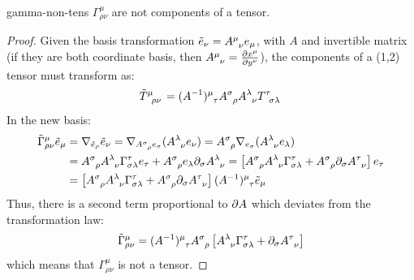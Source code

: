 \begin{proposition}{}{gamma-non-tens}
  $ \Gamma^\mu_{\rho \nu} $ are not components of a tensor.
\end{proposition}

\begin{proofbox}
  \begin{proof}
    Given the basis transformation $ \tilde{e}_\nu = \tensor{A}{^\mu _\nu} e_\mu $, with $ A $ and invertible matrix (if they are both coordinate basis, then $ \tensor{A}{^\mu _\nu} = \frac{\pa x^\mu}{\pa y^\nu} $), the components of a (1,2) tensor must transform as:
    \begin{equation*}
      \tensor{\tilde{T}}{^\mu _\rho _\nu} = \tensor{(A^{-1})}{^\mu _\tau} \tensor{A}{^\sigma _\rho} \tensor{A}{^\lambda _\nu} \tensor{T}{^\tau _\sigma _\lambda}
    \end{equation*}
    In the new basis:
    \begin{equation*}
      \begin{split}
        \tilde{\Gamma}^\mu_{\rho \nu} \tilde{e}_\mu
        &= \na_{\tilde{e}_\rho}\tilde{e}_\nu = \na_{\tensor{A}{^\sigma _\rho} e_\sigma} (\tensor{A}{^\lambda _\nu} e_{\nu}) = \tensor{A}{^\sigma _\rho} \na_{e_\sigma} (\tensor{A}{^\lambda _\nu} e_\lambda) \\
        &= \tensor{A}{^\sigma _\rho} \tensor{A}{^\lambda _\nu} \Gamma^\tau_{\sigma \lambda} e_\tau + \tensor{A}{^\sigma _\rho} e_\lambda \pa_\sigma \tensor{A}{^\lambda _\nu} = \left[ \tensor{A}{^\sigma _\rho} \tensor{A}{^\lambda _\nu} \Gamma^\tau_{\sigma \lambda} + \tensor{A}{^\sigma _\rho} \pa_\sigma \tensor{A}{^\tau _\nu} \right] e_\tau \\
        &= \left[ \tensor{A}{^\sigma _\rho} \tensor{A}{^\lambda _\nu} \Gamma^\tau_{\sigma \lambda} + \tensor{A}{^\sigma _\rho} \pa_\sigma \tensor{A}{^\tau _\nu} \right] \tensor{(A^{-1})}{^\mu _\tau} \tilde{e}_\mu
      \end{split}
    \end{equation*}
    Thus, there is a second term proportional to $ \partial A $ which deviates from the transformation law:
    \begin{equation*}
      \tilde{\Gamma}^\mu_{\rho \nu} = \tensor{(A^{-1})}{^\mu _\tau} \tensor{A}{^\sigma _\rho} \left[ \tensor{A}{^\lambda _\nu} \Gamma^\tau_{\sigma \lambda} + \pa_\sigma \tensor{A}{^\tau _\nu} \right]
    \end{equation*}
    which means that $ \Gamma^\mu_{\rho \nu} $ is not a tensor.
  \end{proof}
\end{proofbox}

